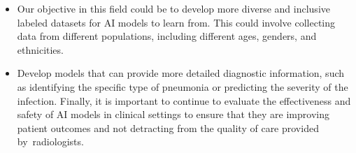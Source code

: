 { 

  \begin{itemize}
  	\item Our objective in this field could be to develop more diverse and inclusive labeled datasets for AI models to learn from. This could involve collecting data from different populations, including different ages, genders, and ethnicities.\newline
  	
  
  	
  	\item Develop models that can provide more detailed diagnostic information, such as identifying the specific type of pneumonia or predicting the severity of the infection. Finally, it is important to continue to evaluate the effectiveness and safety of AI models in clinical settings to ensure that they are improving patient outcomes and not detracting from the quality of care provided by radiologists.\newline
\end{itemize} 
\newpage 


}
